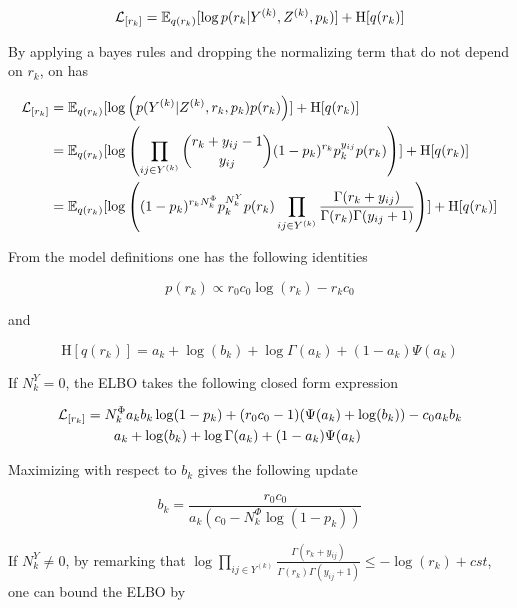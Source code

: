 \begin{align*}
\mathcal{L}_{[r_k]} = \mathbb{E}_{q(r_k)}[\log p(r_k|Y^{(k)},Z^{(k)},p_k)] + \textrm{H}[q(r_k)] \\
\end{align*}

By applying a bayes rules and dropping the normalizing term that do not depend on $r_k$, on has

\begin{align*}
\mathcal{L}_{[r_k]} &= \mathbb{E}_{q(r_k)}[\log \left( p(Y^{(k)}|Z^{(k)}, r_k, p_k) p(r_k) \right)] + \textrm{H}[q(r_k)] \\
    &= \mathbb{E}_{q(r_k)}[\log \left( \prod_{ij\in Y^{(k)}} \dbinom{r_k + y_{ij}-1}{y_{ij}} (1-p_k)^{r_k} p_k^{y_{ij}} p(r_k) \right) ] + \textrm{H}[q(r_k)] \\
    &= \mathbb{E}_{q(r_k)}[\log \left( (1-p_k)^{r_k N^{\Phi}_k} p_k^{N^{Y}_k} p(r_k) \prod_{ij\in Y^{(k)}} \frac{\Gamma(r_k+y_{ij})}{\Gamma(r_k) \Gamma(y_{ij}+1) }  \right) ] + \textrm{H}[q(r_k)]
\end{align*}

From the model definitions one has the following identities

\begin{equation*}
p(r_k) \propto r_0 c_0\log(r_k) - r_k c_0
\end{equation*}

and 

\begin{equation*}
\textrm{H}[q(r_k)] = a_k + \log(b_k) +\log \Gamma(a_k) + (1-a_k)\Psi(a_k)
\end{equation*}

If $N^Y_k=0$, the ELBO takes the following closed form expression

\begin{align*}
\mathcal{L}_{[r_k]} &= N^\Phi_k a_k b_k \log(1-p_k) + (r_0 c_0-1 )(\Psi(a_k) + \log(b_k)) -c_0 a_k b_k   \\
&\qquad a_k + \log(b_k) +\log \Gamma(a_k) + (1-a_k)\Psi(a_k)
\end{align*}

Maximizing with respect to $b_k$ gives the following update

\begin{equation}\label{eq:update1}
b_k = \frac{r_0 c_0}{a_k (c_0 - N^\Phi_k \log(1-p_k))}
\end{equation}

If $N^Y_k \neq 0$, by remarking that $\log \prod_{ij\in Y^{(k)}} \frac{\Gamma(r_k+y_{ij})}{\Gamma(r_k) \Gamma(y_{ij}+1) } \leq -\log(r_k) + cst$, one can bound the ELBO by

